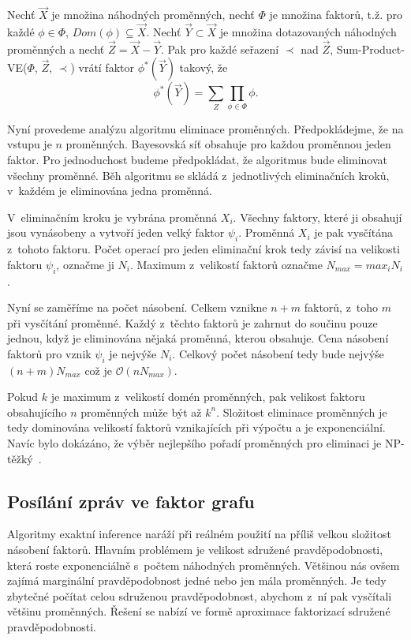 Nechť $\vec{X}$ je množina náhodných proměnných, nechť $\Phi$ je množina faktorů, t.ž. pro každé $\phi \in \Phi$, $Dom(\phi) \subseteq \vec{X}$.
Nechť $\vec{Y} \subset \vec{X}$ je množina dotazovaných náhodných proměnných a nechť $\vec{Z} = \vec{X} - \vec{Y}$.
Pak pro každé seřazení $\prec$ nad $\vec{Z}$, Sum-Product-VE($\Phi$, $\vec{Z}$, $\prec$) vrátí faktor $\phi^*(\vec{Y})$ takový, že
\[
\phi^*(\vec{Y}) = \sum_Z \prod_{\phi \in \Phi} \phi.
\]

Nyní provedeme analýzu algoritmu eliminace proměnných.
Předpokládejme, že na vstupu je $n$ proměnných.
Bayesovská síť obsahuje pro každou proměnnou jeden faktor.
Pro jednoduchost budeme předpokládat, že algoritmus bude eliminovat všechny proměnné.
Běh algoritmu se skládá z~jednotlivých eliminačních kroků, v~každém je eliminována jedna proměnná.

V~eliminačním kroku je vybrána proměnná $X_i$. 
Všechny faktory, které ji obsahují jsou vynásobeny a vytvoří jeden velký faktor $\psi_i$.
Proměnná $X_i$ je pak vysčítána z~tohoto faktoru.
Počet operací pro jeden eliminační krok tedy závisí na velikosti faktoru $\psi_i$, označme ji $N_i$.
Maximum z~velikostí faktorů označme $N_{max} = max_i N_i$.

Nyní se zaměříme na počet násobení.
Celkem vznikne $n+m$ faktorů, z~toho $m$ při vysčítání proměnné.
Každý z~těchto faktorů je zahrnut do součinu pouze jednou, když je eliminována nějaká proměnná, kterou obsahuje.
Cena násobení faktorů pro vznik $\psi_i$ je nejvýše $N_i$.
Celkový počet násobení tedy bude nejvýše $(n+m)N_{max}$ což je $\mathcal{O}(nN_{max})$.

Pokud $k$ je maximum z~velikostí domén proměnných, pak velikost faktoru obsahujícího $n$ proměnných může být až $k^n$.
Složitost eliminace proměnných je tedy dominována velikostí faktorů vznikajících při výpočtu a je exponenciální.
Navíc bylo dokázáno, že výběr nejlepšího pořadí proměnných pro eliminaci je NP-těžký~\cite{arnborg1987complexity}.

\subsection{Posílání zpráv ve faktor grafu}

Algoritmy exaktní inference naráží při reálném použití na příliš velkou složitost násobení faktorů.
Hlavním problémem je velikost sdružené pravděpodobnosti, která roste exponenciálně s~počtem náhodných proměnných.
Většinou nás ovšem zajímá marginální pravděpodobnost jedné nebo jen mála proměnných.
Je tedy zbytečné počítat celou sdruženou pravděpodobnost, abychom z~ní pak vysčítali většinu proměnných.
Řešení se nabízí ve formě aproximace faktorizací sdružené pravděpodobnosti.

